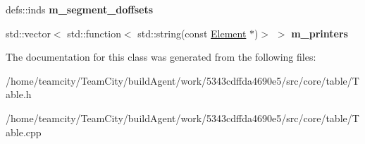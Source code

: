 \begin{DoxyCompactItemize}
\item 
defs\+::inds {\bfseries m\+\_\+segment\+\_\+doffsets}\hypertarget{classTable_a89fb368e301134b6f5e9c0a1d54a27a1}{}\label{classTable_a89fb368e301134b6f5e9c0a1d54a27a1}

\item 
std\+::vector$<$ std\+::function$<$ std\+::string(const \hyperlink{classElement}{Element} $\ast$)$>$ $>$ {\bfseries m\+\_\+printers}\hypertarget{classTable_a2f1a4a01984b70bf66e8d63fe9bbbac4}{}\label{classTable_a2f1a4a01984b70bf66e8d63fe9bbbac4}

\end{DoxyCompactItemize}


The documentation for this class was generated from the following files\+:\begin{DoxyCompactItemize}
\item 
/home/teamcity/\+Team\+City/build\+Agent/work/5343cdffda4690e5/src/core/table/Table.\+h\item 
/home/teamcity/\+Team\+City/build\+Agent/work/5343cdffda4690e5/src/core/table/Table.\+cpp\end{DoxyCompactItemize}

